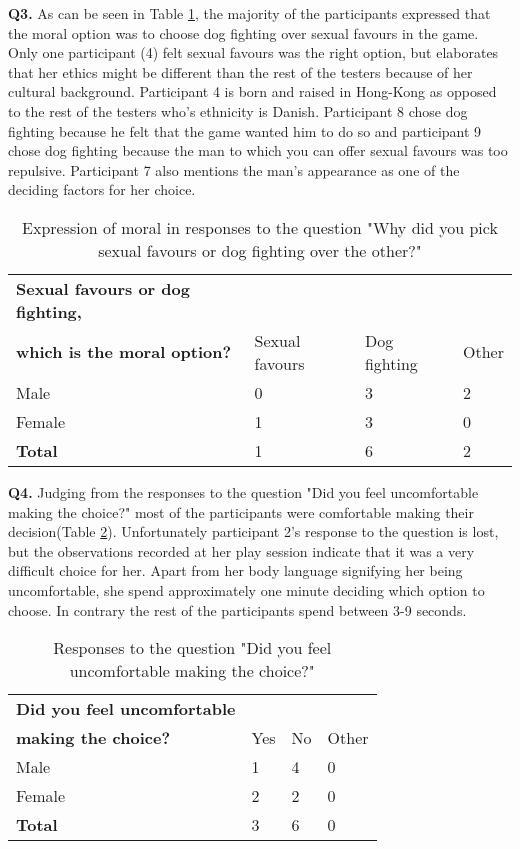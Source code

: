\textbf{Q3.}  As can be seen in Table \ref{tab:choice}, the majority of the participants expressed that the moral option was to choose dog fighting over sexual favours in the game. Only one participant (4) felt sexual favours was the right option, but elaborates that her ethics might be different than the rest of the testers because of her cultural background. Participant 4 is born and raised in Hong-Kong as opposed to the rest of the testers who's ethnicity is Danish. Participant 8 chose dog fighting because he felt that the game wanted him to do so and participant 9 chose dog fighting because the man to which you can offer sexual favours was too repulsive. Participant 7 also mentions the man's appearance as one of the deciding factors for her choice.

\begin{table}[h]
\centering
\begin{tabular}{l l l l}
\hline
\textbf{Sexual favours or dog fighting,}\\
\textbf{which is the moral option?} & Sexual favours & Dog fighting & Other \\
\hline
Male & 0 & 3 & 2 \\
Female & 1 & 3 & 0 \\
\textbf{Total} & 1 & 6 & 2 \\
\hline
\end{tabular}
\caption{\label{tab:choice}Expression of moral in responses to the question "Why did you pick sexual favours or dog fighting over the other?"}
\end{table}

\textbf{Q4.} Judging from the responses to the question "Did you feel uncomfortable making the choice?" most of the participants were comfortable making their decision(Table \ref{tab:unco}). Unfortunately participant 2's response to the question is lost, but the observations recorded at her play session indicate that it was a very difficult choice for her. Apart from her body language signifying her being uncomfortable, she spend approximately one minute deciding which option to choose. In contrary the rest of the participants spend between 3-9 seconds. 

\begin{table}[h]
\centering
\begin{tabular}{l l l l}
\hline
\textbf{Did you feel uncomfortable}\\
\textbf{making the choice?} & Yes & No & Other \\
\hline
Male & 1 & 4 & 0 \\
Female & 2 & 2 & 0 \\
\textbf{Total} & 3 & 6 & 0 \\
\hline
\end{tabular}
\caption{\label{tab:unco}Responses to the question "Did you feel uncomfortable making the choice?"}
\end{table}


